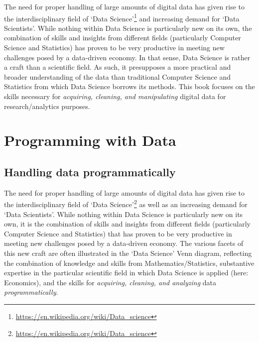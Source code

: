 \documentclass[
  12pt,
]{style/krantz}
\renewcommand{\href}[2]{#2\footnote{\url{#1}}}
\begin{document}
The need for proper handling of large amounts of digital data has given rise to the interdisciplinary field of \href{https://en.wikipedia.org/wiki/Data_science}{`Data Science'} and increasing demand for `Data Scientists'. While nothing within Data Science is particularly new on its own, the combination of skills and insights from different fields (particularly Computer Science and Statistics) has proven to be very productive in meeting new challenges posed by a data-driven economy. In that sense, Data Science is rather a craft than a scientific field. As such, it presupposes a more practical and broader understanding of the data than traditional Computer Science and Statistics from which Data Science borrows its methods. This book focuses on the skills necessary for \emph{acquiring, cleaning, and manipulating} digital data for research/analytics purposes.

\hypertarget{programming-with-data}{%
\chapter{Programming with Data}\label{programming-with-data}}

\hypertarget{handling-data-programmatically}{%
\section{Handling data programmatically}\label{handling-data-programmatically}}

The need for proper handling of large amounts of digital data has given rise to the interdisciplinary field of \href{https://en.wikipedia.org/wiki/Data_science}{`Data Science'} as well as an increasing demand for `Data Scientists'. While nothing within Data Science is particularly new on its own, it is the combination of skills and insights from different fields (particularly Computer Science and Statistics) that has proven to be very productive in meeting new challenges posed by a data-driven economy. The various facets of this new craft are often illustrated in the `Data Science' Venn diagram, reflecting the combination of knowledge and skills from Mathematics/Statistics, substantive expertise in the particular scientific field in which Data Science is applied (here: Economics), and the skills for \emph{acquiring, cleaning, and analyzing} data \emph{programmatically}.
\end{document}
